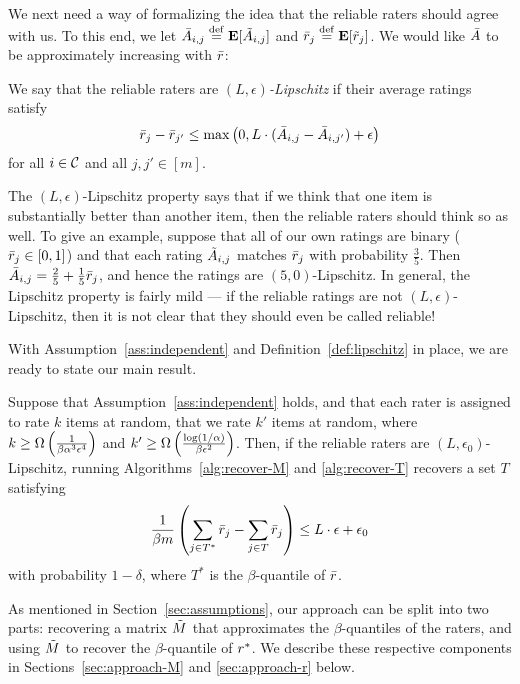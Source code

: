 We next need a way of formalizing the idea that the reliable raters should 
agree with us. To this end, we let 
$\bar{A}_{i,j} \stackrel{\rm def}{=} \mathbf{E}[\tilde{A}_{i,j}]$ and $\bar{r}_j \stackrel{\rm def}{=} \mathbf{E}[\tilde{r}_j]$. We 
would like $\bar{A}$ to be approximately increasing with $\bar{r}$:
\begin{definition}
\label{def:lipschitz}
We say that the reliable raters are \emph{$(L,\epsilon)$-Lipschitz} if their 
average ratings satisfy
\begin{equation}
\label{eq:lipschitz}
\bar{r}_j - \bar{r}_{j'} \leq \max\left( 0, L \cdot (\bar{A}_{i,j} - \bar{A}_{i,j'}) + \epsilon \right)
\end{equation}
for all $i \in \mathcal{C}$ and all $j,j' \in [m]$.
\end{definition}
The $(L,\epsilon)$-Lipschitz property says that if we think that one item is 
substantially better than another item, then the reliable raters should think 
so as well. To give an example, suppose that all of our own ratings are binary 
($\bar{r}_j \in [0,1]$) and that each rating $\tilde{A}_{i,j}$ matches $\bar{r}_j$ 
with probability $\frac{3}{5}$. Then 
$\bar{A}_{i,j} = \frac{2}{5} + \frac{1}{5}\bar{r}_j$, 
and hence the ratings are $(5,0)$-Lipschitz. 
In general, the Lipschitz property is fairly mild --- if the reliable ratings 
are not $(L,\epsilon)$-Lipschitz, then it is not clear that they should 
even be called reliable!

With Assumption~\ref{ass:independent} and Definition~\ref{def:lipschitz} 
in place, we are ready to state our main result. 

\begin{theorem}
\label{thm:main}
Suppose that Assumption~\ref{ass:independent} holds, and that each rater is 
assigned to rate $k$ items at random, that we rate $k'$ items at random, 
where $k \geq \Omega\left( \frac{1}{\beta\alpha^3\epsilon^4} \right)$ and 
$k' \geq \Omega\left( \frac{\log(1/\alpha)}{\beta\epsilon^2} \right)$.
Then, if the reliable raters are $(L,\epsilon_0)$-Lipschitz, running 
Algorithms~\ref{alg:recover-M} and \ref{alg:recover-T} recovers a set 
$T$ satisfying 
\[ \frac{1}{\beta m} \left( \sum_{j \in T^*} \bar{r}_j - \sum_{j \in T} \bar{r}_j \right) 
\leq L \cdot \epsilon + \epsilon_0 \]
with probability $1-\delta$, where $T^*$ is the $\beta$-quantile of $\bar{r}$.
\end{theorem}

As mentioned in Section~\ref{sec:assumptions}, our approach can be split into 
two parts: recovering a matrix $\tilde{M}$ that approximates the $\beta$-quantiles of 
the raters, and using $\tilde{M}$ to recover the $\beta$-quantile of $r^*$. We 
describe these respective components in Sections~\ref{sec:approach-M} and 
\ref{sec:approach-r} below.

